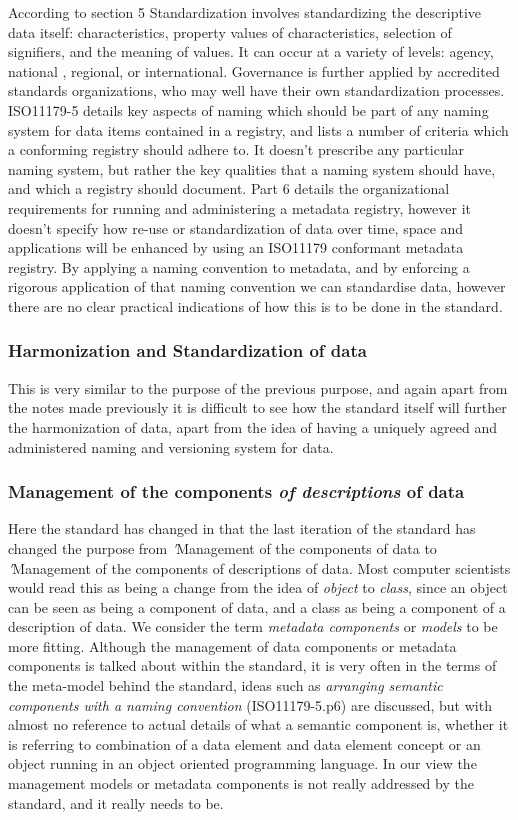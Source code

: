 \documentclass{llncs}
\begin{document}
According to section 5 Standardization involves standardizing the descriptive data itself: characteristics, property values of characteristics, selection of signifiers, and the meaning of values.  It can occur at a variety of levels: agency, national , regional, or international. Governance is further applied by accredited standards organizations, who may well have their own standardization processes. ISO11179-5 details key aspects of naming which should be part of any naming system for data items contained in a registry, and lists a number of criteria which a conforming registry should adhere to. It doesn't prescribe any particular naming system, but rather the key qualities that a naming system should have, and which a registry should document. Part 6 details the organizational requirements for running and administering a metadata registry, however it doesn't specify how re-use or standardization of data over time, space and applications will be enhanced by using an ISO11179 conformant metadata registry. By applying a naming convention to metadata, and by enforcing a rigorous application of that naming convention we can standardise data, however there are no clear practical indications of how this is to be done in the standard.


\subsubsection{Harmonization and Standardization of data}

This is very similar to the purpose of the previous purpose, and again apart from the notes made previously it is difficult to see how the standard itself will further the harmonization of data, apart from the idea of having a uniquely agreed and administered naming and versioning system for data.

\subsubsection{Management of the components \emph{of descriptions} of data}

Here the standard has changed in that the last iteration of the standard has changed the purpose from \emph'{Management of the components of data} to \emph'{Management of the components of descriptions of data}. Most computer scientists would read this as being a change from the idea of \emph{object} to \emph{class}, since an object can be seen as being a component of data, and a class as being a component of a description of data. We consider the term \emph{metadata components} or \emph{models} to be more fitting. Although the management of data components or metadata components is talked about within the standard, it is very often in the terms of the meta-model behind the standard, ideas such as \emph{arranging semantic components with a naming convention} (ISO11179-5.p6) are discussed, but with almost no reference to actual details of what a semantic component is, whether it is referring to combination of a data element and data element concept or an object running in an object oriented programming language. In our view the management models or metadata components is not really addressed by the standard, and it really needs to be.
\end{document}
